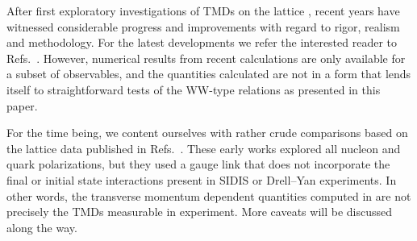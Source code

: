 \documentclass[a4paper,11pt]{article}
\begin{document}
After first exploratory investigations of TMDs on the lattice
\cite{Hagler:2009mb,Musch:2010ka}, recent years have witnessed considerable
progress and improvements with regard to rigor, realism and methodology.
For the latest developments we refer the
	interested reader to Refs.~\cite{Alexandrou:2017dzj,Ishikawa:2017faj,
	Engelhardt:2015xja,%
	Ji:2014hxa,%
	Musch:2011er,%
   Ji:2017oey,Yoon:2017qzo,Green:2017xeu,Zhang:2017bzy}.
However, numerical results from recent calculations are only available
for a subset of observables, and the quantities calculated are not in a
form that lends itself to straightforward tests of the WW-type relations
as presented in this paper.
   



For the time being, we content ourselves with rather crude comparisons
based on the lattice data
published in Refs.~\cite{Hagler:2009mb,Musch:2010ka}.
These early works explored all nucleon and quark polarizations, but
they used a gauge link that does not incorporate the final or initial
state interactions present in SIDIS or Drell--Yan experiments. In other
words, the transverse momentum dependent quantities computed in
\cite{Hagler:2009mb,Musch:2010ka} are not precisely the TMDs measurable
in experiment. More caveats will be discussed along the way.
\end{document}
